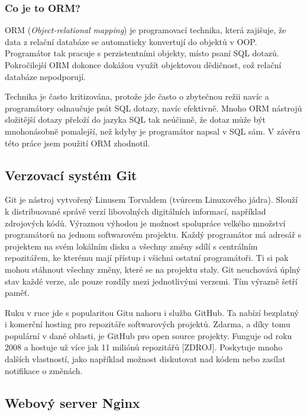 \subsubsection{Co je to ORM?}


ORM (\textit{Object-relational mapping}) je programovací technika, která zajišuje, že data z relační databáze
se automaticky konvertují do objektů v OOP. Programátor tak pracuje s perzistentními objekty,
místo psaní SQL dotazů. Pokročilejší ORM dokonce dokážou využít objektovou dědičnost, což relační databáze nepodporují.

Technika je často kritizována, protože jde často o zbytečnou režii navíc
a programátory odnaučuje psát SQL dotazy, navíc efektivně.
Mnoho ORM nástrojů složitější dotazy přeloží do jazyka SQL tak neúčinně,
že dotaz může být mnohonásobně pomalejší, než kdyby je programátor napsal v SQL sám.
V závěru této práce jsem použití ORM zhodnotil.

\subsection{Verzovací systém Git}

Git je nástroj vytvořený Linusem Torvaldem (tvůrcem Linuxového jádra).
Slouží k distribuované správě verzí libovolných digitálních informací, například zdrojových kódů.
Výraznou výhodou je možnost spolupráce velkého množství programátorů na jednom softwarovém projektu. 
Každý programátor má adresář s projektem na svém lokálním disku a všechny změny sdílí s centrálním repozitářem,
ke kterému mají přístup i všichni ostatní programátoři. Ti si pak mohou stáhnout všechny změny,
které se na projektu staly. Git neuchovává úplný stav každé verze, ale pouze rozdíly mezi jednotlivými verzemi.
Tím výrazně šetří paměť.  

Ruku v ruce jde s popularitou Gitu nahoru i služba GitHub.
Ta nabízí bezplatný i komerční hosting pro repozitáře softwarových projektů.
Zdarma, a díky tomu populární v dané oblasti, je GitHub pro open source projekty.
Funguje od roku 2008 a hostuje už více jak 11 miliónů repozitářů [ZDROJ].
Poskytuje mnoho dalších vlastností, jako například možnost diskutovat nad kódem
nebo zasílat notifikace o změnách.

\subsection{Webový server Nginx}

